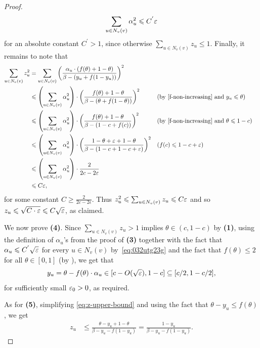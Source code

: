 \begin{proof}
\begin{equation}\label{eq:032utg23g}
\sum_{u\in N_v(v)} \alpha_u^2\leqslant C^{'} \varepsilon
\end{equation} 
for an absolute constant $C^{'}>1$, since otherwise $ \sum_{u \in N_v(v)} z_u\leq 1$. Finally, it remains to note that 
	\begin{align*}
	\sum_{u\in N_v(v)} z_u^2&=\sum_{u\in N_v(v)} \left(\frac{\alpha_u  \cdot (f(\theta)+1-\theta)}{\beta-(y_u+f(1-y_u))}\right)^2\\
	&\leq \left(\sum_{u\in N_v(v)} \alpha_u^2\right)\cdot \left(\frac{f(\theta)+1-\theta}{\beta-(\theta+f(1-\theta))}\right)^2 && \text{(by \Cref{f-non-increasing} and $y_u \leq \theta$)}\\
	&\leq \left(\sum_{u\in N_v(v)} \alpha_u^2\right)\cdot \left(\frac{f(\theta)+1-\theta}{\beta-(1-c+f(c))}\right)^2 && \text{(by \Cref{f-non-increasing} and $\theta\leq 1-c$)}\\	
	&\leq \left(\sum_{u\in N_v(v)} \alpha_u^2\right)\cdot \left(\frac{1-\theta+\eps+1-\theta}{\beta-(1-c+1-c+\eps)}\right)^2 && \text{($f(c)\leq 1-c+\eps$)}\\		
	& \leq \left(\sum_{u\in N_v(v)} \alpha_u^2\right)\cdot \frac{2}{2c-2\e}\\
	& \leq C \e,
	\end{align*}
	for some constant $C\geq \frac{2}{2c-2\epsilon}$. Thus $z_u^2 \leqslant \sum_{u\in N_v(v)} z_u \leqslant C\varepsilon$ and so $z_u \leqslant \sqrt{C \cdot \varepsilon } \leqslant C \sqrt{\varepsilon}$, as claimed. 
	
	We now prove {\bf (4)}. Since $\sum_{u \in N_v(v)} z_u > 1$ implies $\theta\in (c, 1-c)$ by {\bf (1)}, using the definition of $\alpha_u$'s from the proof of {\bf (3)} together with the fact that $\alpha_u\leqslant C^{'} \sqrt{\varepsilon}$ for every $u\in N_v(v)$ by~\eqref{eq:032utg23g} and the fact that $f(\theta)\leq 2$ for all $\theta\in [0,1]$ (by ), we get that
	\begin{equation*}
	\begin{split}
	y_u=\theta-f(\theta)\cdot \alpha_u\in [c-O(\sqrt{\varepsilon}), 1-c]\subseteq [c/2, 1-c/2],
	\end{split}
	\end{equation*}
	for sufficiently small $\varepsilon_0>0$, as required.

    As for {\bf (5)}, simplifying \eqref{eq:z-upper-bound} and using the fact that $\theta - y_u \leq f(\theta)$, we get
\begin{align*}
  z_u &\leq \frac{\theta - y_u + 1 - \theta}{\beta - y_u - f(1 - y_u)} = \frac{1 - y_u}{\beta - y_u - f(1 - y_u)}.
\end{align*}


\end{proof}
